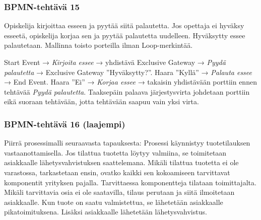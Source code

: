 \documentclass[
  finnish,
  letterpaper,
  DIV=11,
  numbers=noendperiod,
  oneside]{scrreprt}
\begin{document}
\subsubsection{BPMN-tehtävä 15}\label{bpmn-tehtuxe4vuxe4-15}

Opiskelija kirjoittaa esseen ja pyytää siitä palautetta. Jos opettaja ei
hyväksy esseetä, opiskelija korjaa sen ja pyytää palautetta uudelleen.
Hyväksytty essee palautetaan. Mallinna toisto porteilla ilman
Loop-merkintää.

\begin{tcolorbox}[enhanced jigsaw, arc=.35mm, bottomrule=.15mm, bottomtitle=1mm, breakable, colback=white, colbacktitle=quarto-callout-tip-color!10!white, colframe=quarto-callout-tip-color-frame, coltitle=black, left=2mm, leftrule=.75mm, opacityback=0, opacitybacktitle=0.6, rightrule=.15mm, title=\textcolor{quarto-callout-tip-color}{\faLightbulb}\hspace{0.5em}{Malliratkaisu}, titlerule=0mm, toprule=.15mm, toptitle=1mm]

Start Event → \emph{Kirjoita essee} → yhdistävä Exclusive Gateway →
\emph{Pyydä palautetta} → Exclusive Gateway ''Hyväksytty?''. Haara
''Kyllä'' → \emph{Palauta essee} → End Event. Haara ''Ei'' →
\emph{Korjaa essee} → takaisin yhdistävään porttiin ennen tehtävää
\emph{Pyydä palautetta}. Taaksepäin palaava järjestysvirta johdetaan
porttiin eikä suoraan tehtävään, jotta tehtävään saapuu vain yksi virta.

\end{tcolorbox}

\subsubsection{BPMN-tehtävä 16
(laajempi)}\label{bpmn-tehtuxe4vuxe4-16-laajempi}

Piirrä prosessimalli seuraavasta tapauksesta: Prosessi käynnistyy
tuotetilauksen vastaanottamisella. Jos tilattua tuotetta löytyy
valmiina, se toimitetaan asiakkaalle lähetysvahvistuksen saattelemana.
Mikäli tilattua tuotetta ei ole varastossa, tarkastetaan ensin, ovatko
kaikki sen kokoamiseen tarvittavat komponentit yrityksen pajalla.
Tarvittaessa komponentteja tilataan toimittajalta. Mikäli tarvittavia
osia ei ole saatavilla, tilaus perutaan ja siitä ilmoitetaan
asiakkaalle. Kun tuote on saatu valmistettua, se lähetetään asiakkaalle
pikatoimituksena. Lisäksi asiakkaalle lähetetään lähetysvahvistus.
\end{document}
